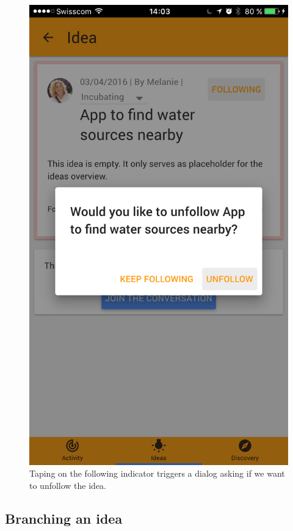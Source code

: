 \documentclass[a4paper,12pt,twoside]{article}
\begin{document}
\begin{figure}[!htb]
\begin{minipage}[t]{.48\textwidth}
        \includegraphics[width=.67\textwidth]{images/flow_follow_4.png}
        \caption{Taping on the following indicator triggers a dialog asking if we want to unfollow the idea.}
    \end{minipage}
\end{figure}

\clearpage
\subsection{Branching an idea}
\end{document}
